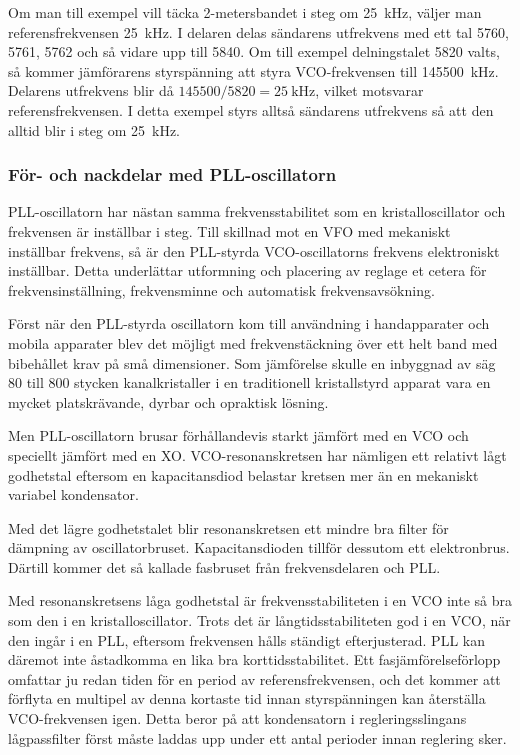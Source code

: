 Om man till exempel vill täcka 2-metersbandet i steg om \SI{25}{\kilo\hertz},
väljer man referensfrekvensen \SI{25}{\kilo\hertz}.
I delaren delas sändarens utfrekvens med ett tal 5760, 5761, 5762 och så vidare
upp till 5840.
Om till exempel delningstalet 5820 valts, så kommer jämförarens styrspänning att
styra VCO-frekvensen till \SI{145500}{\kilo\hertz}.
Delarens utfrekvens blir då \(145500/5820 = \SI{25}{\kilo\hertz}\), vilket
motsvarar referensfrekvensen.
I detta exempel styrs alltså sändarens utfrekvens så att den alltid blir i steg
om \SI{25}{\kilo\hertz}.

\subsubsection{För- och nackdelar med PLL-oscillatorn}

PLL-oscillatorn har nästan samma frekvensstabilitet som en
kristalloscillator och frekvensen är inställbar i steg.
Till skillnad mot en VFO med mekaniskt inställbar frekvens, så är den PLL-styrda
VCO-oscillatorns frekvens elektroniskt inställbar.
Detta underlättar utformning och placering av reglage et cetera för
frekvensinställning, frekvensminne och automatisk frekvensavsökning.

Först när den PLL-styrda oscillatorn kom till användning i handapparater och
mobila apparater blev det möjligt med frekvenstäckning över ett helt band med
bibehållet krav på små dimensioner.
Som jämförelse skulle en inbyggnad av säg 80 till 800 stycken kanalkristaller
i en traditionell kristallstyrd apparat vara en mycket platskrävande, dyrbar
och opraktisk lösning.

Men PLL-oscillatorn brusar förhållandevis starkt jämfört med en VCO och
speciellt jämfört med en XO.
VCO-resonanskretsen har nämligen ett relativt lågt godhetstal eftersom en
kapacitansdiod belastar kretsen mer än en mekaniskt variabel kondensator.

Med det lägre godhetstalet blir resonanskretsen ett mindre bra
filter för dämpning av oscillatorbruset.
Kapacitansdioden tillför dessutom ett elektronbrus.
Därtill kommer det så kallade fasbruset från frekvensdelaren och PLL.

Med resonanskretsens låga godhetstal är frekvensstabiliteten i en VCO inte så
bra som den i en kristalloscillator.
Trots det är långtidsstabiliteten god i en VCO, när den ingår i en PLL,
eftersom frekvensen hålls ständigt efterjusterad.
PLL kan däremot inte åstadkomma en lika bra korttidsstabilitet.
Ett fasjämförelseförlopp omfattar ju redan tiden för en period av
referensfrekvensen, och det kommer att förflyta en multipel av denna kortaste 
tid innan styrspänningen kan återställa VCO-frekvensen igen.
Detta beror på att kondensatorn i regleringsslingans lågpassfilter först måste
laddas upp under ett antal perioder innan reglering sker.

